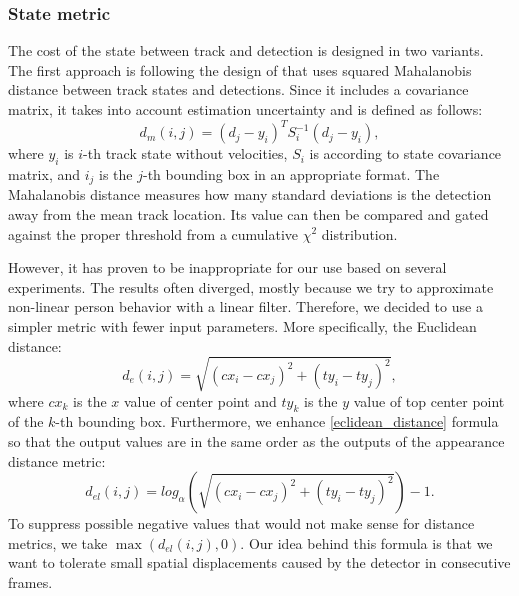         \subsubsection{State metric}\label{state_metric}
            The cost of the state between track and detection is designed in two variants. The first approach is following the design of \cite{wojke2017simple} that uses squared Mahalanobis distance between track states and detections. Since it includes a covariance matrix, it takes into account estimation uncertainty and is defined as follows:
            \begin{equation}
                d_m(i,j) = \left(d_j - y_i\right)^T S_i^{-1} \left(d_j - y_i\right), 
            \end{equation}
            where $y_i$ is $i$-th track state without velocities, $S_i$ is according to state covariance matrix, and $i_j$ is the $j$-th bounding box in an appropriate format. The Mahalanobis distance measures how many standard deviations is the detection away from the mean track location. Its value can then be compared and gated against the proper threshold from a cumulative $\chi^2$ distribution. 
            
            However, it has proven to be inappropriate for our use based on several experiments. The results often diverged, mostly because we try to approximate non-linear person behavior with a linear filter. Therefore, we decided to use a simpler metric with fewer input parameters. More specifically, the Euclidean distance:  
            \begin{equation}\label{eclidean_distance}
                d_e(i,j) = \sqrt{\left(cx_i - cx_j\right)^2 + \left(ty_i - ty_j\right)^2}, 
            \end{equation}
            where $cx_k$ is the $x$ value of center point and $ty_k$ is the $y$ value of top center point of the $k$-th bounding box. Furthermore, we enhance \ref{eclidean_distance} formula so that the output values are in the same order as the outputs of the appearance distance metric:
            \begin{equation}
                d_{el}(i,j) = log_{\alpha}\left(\sqrt{\left(cx_i - cx_j\right)^2 + \left(ty_i - ty_j\right)^2}\right) - 1.
            \end{equation}
            To suppress possible negative values that would not make sense for distance metrics, we take $ \max \left(d_{el}(i,j), 0 \right)$. Our idea behind this formula is that we want to tolerate small spatial displacements caused by the detector in consecutive frames. 
            
